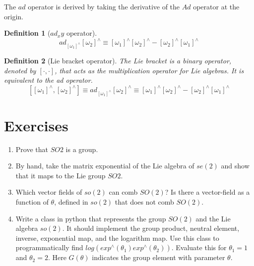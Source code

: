 \documentclass{book}
\newtheorem{definition}{Definition}
\begin{document}
The $ad$ operator is derived by taking the derivative of the $Ad$ operator at the origin.
%
\begin{definition}[$ad_x y$ operator]
$$ad_{[\omega_1]^{\wedge}} [\omega_2]^{\wedge} \equiv [\omega_1]^{\wedge} [\omega_2]^{\wedge} - [\omega_2]^{\wedge} [\omega_1]^{\wedge}$$
\end{definition}
%
\begin{definition}[Lie bracket operator]
The Lie bracket is a binary operator, denoted by $\left[ \cdot , \cdot \right]$,  that acts as the multiplication operator for Lie algebras. It is equivalent to the ad operator.
$$\left[[\omega_1]^{\wedge}, [\omega_2]^{\wedge}\right] \equiv ad_{[\omega_1]^{\wedge}} [\omega_2]^{\wedge} \equiv [\omega_1]^{\wedge} [\omega_2]^{\wedge} - [\omega_2]^{\wedge} [\omega_1]^{\wedge}$$
\label{def:lie_bracket}
\end{definition}
%

\section*{Exercises}

\begin{enumerate}
    \item Prove that $SO2$ is a group.
    \item By hand, take the matrix exponential of the Lie algebra of $se(2)$ and show that it
      maps to the Lie group $SO2$.
    \item Which vector fields of $so(2)$ can comb $SO(2)$? Is there a vector-field as a
      function of $\theta$, defined in $so(2)$ that does not comb $SO(2)$.
    \item Write a class in python that represents the group $SO(2)$ and the Lie algebra $so(2)$.
      It should implement the group product, neutral element, inverse, exponential map,
      and the logarithm map. Use this class to programmatically find $log(exp^\wedge(\theta_1)exp^\wedge(\theta_2))$.
      Evaluate this for $\theta_1=1$ and $\theta_2=2$.  Here $G(\theta)$ indicates the group element with parameter $\theta$.
\end{enumerate}
\end{document}
